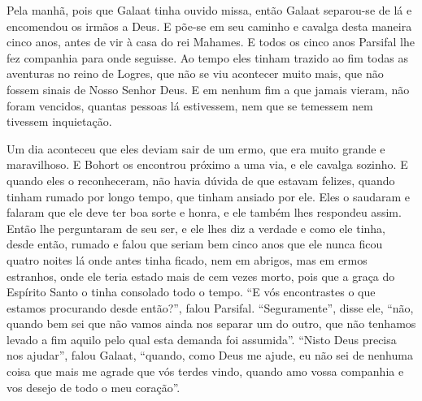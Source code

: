 Pela manhã, pois que Galaat tinha ouvido missa, então Galaat separou-se de lá e
encomendou os irmãos a Deus. E põe-se em seu caminho e cavalga desta maneira
cinco anos, antes de vir à casa do rei Mahames. E todos os cinco anos Parsifal
lhe fez companhia para onde seguisse. Ao tempo eles tinham trazido ao fim todas
as aventuras no reino de Logres, que não se viu acontecer muito mais, que não
fossem sinais de Nosso Senhor Deus. E em nenhum fim a que jamais vieram, não
foram vencidos, quantas pessoas lá estivessem, nem que se temessem nem tivessem
inquietação. 

Um dia aconteceu que eles deviam sair de um ermo, que era muito grande e
maravilhoso. E Bohort os encontrou próximo a uma via, e ele cavalga sozinho. E
quando eles o reconheceram, não havia dúvida de que estavam felizes, quando
tinham rumado por longo tempo, que tinham ansiado por ele. Eles o saudaram e
falaram que ele deve ter boa sorte e honra, e ele também lhes respondeu assim.
Então lhe perguntaram de seu ser, e ele lhes diz a verdade e como ele tinha,
desde então, rumado e falou que seriam bem cinco anos que ele nunca ficou
quatro noites lá onde antes tinha ficado, nem em abrigos, mas em ermos
estranhos, onde ele teria estado mais de cem vezes morto, pois que a graça do
Espírito Santo o tinha consolado todo o tempo. “E vós encontrastes o que
estamos procurando desde então?”, falou Parsifal. “Seguramente”, disse ele,
“não, quando bem sei que não vamos ainda nos separar um do outro, que não
tenhamos levado a fim aquilo pelo qual esta demanda foi assumida”. “Nisto Deus
precisa nos ajudar”, falou Galaat, “quando, como Deus me ajude, eu não sei de
nenhuma coisa que mais me agrade que vós terdes vindo, quando amo vossa
companhia e vos desejo de todo o meu coração”. 

